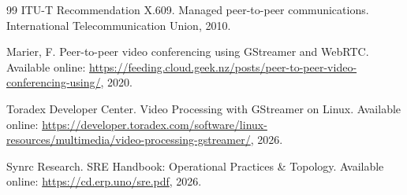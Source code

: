 \documentclass{article}
\begin{document}
\begin{thebibliography}{99}
ITU-T Recommendation X.609.
\newblock Managed peer-to-peer communications.
\newblock International Telecommunication Union, 2010.

Marier, F.
\newblock Peer-to-peer video conferencing using GStreamer and WebRTC.
\newblock Available online: \url{https://feeding.cloud.geek.nz/posts/peer-to-peer-video-conferencing-using/}, 2020.

Toradex Developer Center.
\newblock Video Processing with GStreamer on Linux.
\newblock Available online:
  \url{https://developer.toradex.com/software/linux-resources/multimedia/video-processing-gstreamer/}, 2026.

Synrc Research.
\newblock SRE Handbook: Operational Practices \& Topology.
\newblock Available online: \url{https://cd.erp.uno/sre.pdf}, 2026.

\end{thebibliography}
\end{document}
